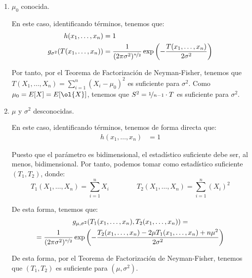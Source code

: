 \begin{ejemplo}
\begin{enumerate}
        Por tanto, por el Teorema de Factorización de Neyman-Fisher, tenemos que $T(X_1, \ldots, X_n) = \sum\limits_{i=1}^n X_i$ es suficiente para $\mu$. En particular, como $\ol{X}= \nicefrac{1}{n} \cdot T$, tenemos que $\ol{X}$ es suficiente para $\mu$.
        \item $\mu_0$ conocida.
        
        En este caso, identificando términos, tenemos que:
        \begin{align*}
            h(x_1, \ldots, x_n) &= 1 \\
            g_{\sigma^2}(T(x_1, \ldots, x_n)) &= \dfrac{1}{(2\pi\sigma^2)^{\nicefrac{n}{2}}} \exp\left(-\dfrac{T(x_1, \ldots, x_n)}{2\sigma^2}\right)
        \end{align*}

        Por tanto, por el Teorema de Factorización de Neyman-Fisher, tenemos que $T(X_1, \ldots, X_n) = \sum\limits_{i=1}^n (X_i-\mu_0)^2$ es suficiente para $\sigma^2$. Como $\mu_0=E[X]=E[\ol{X}]$, tenemos que $S^2 = \nicefrac{1}{n-1} \cdot T$ es suficiente para $\sigma^2$.
        \item $\mu$ y $\sigma^2$ desconocidas.
        
        En este caso, identificando términos, tenemos de forma directa que:
        \begin{align*}
            h(x_1, \ldots, x_n) &= 1
        \end{align*}

        Puesto que el parámetro es bidimensional, el estadístico suficiente debe ser, al menos, bidimensional. Por tanto, podemos tomar como estadístico suficiente $(T_1, T_2)$, donde:
        \begin{equation*}
            T_1(X_1, \ldots, X_n) = \sum\limits_{i=1}^n X_i \qquad \qquad T_2(X_1, \ldots, X_n) = \sum\limits_{i=1}^n (X_i)^2
        \end{equation*}

        De esta forma, tenemos que:
        \begin{multline*}
            g_{\mu, \sigma^2}(T_1(x_1, \ldots, x_n), T_2(x_1, \ldots, x_n)) =\\= \dfrac{1}{(2\pi\sigma^2)^{\nicefrac{n}{2}}} \exp\left(-\dfrac{T_2(x_1, \ldots, x_n) - 2\mu T_1(x_1, \ldots, x_n) + n\mu^2}{2\sigma^2}\right)
        \end{multline*}
        
        De esta forma, por el Teorema de Factorización de Neyman-Fisher, tenemos que $(T_1, T_2)$ es suficiente para $(\mu, \sigma^2)$.
    \end{enumerate}
\end{ejemplo}



